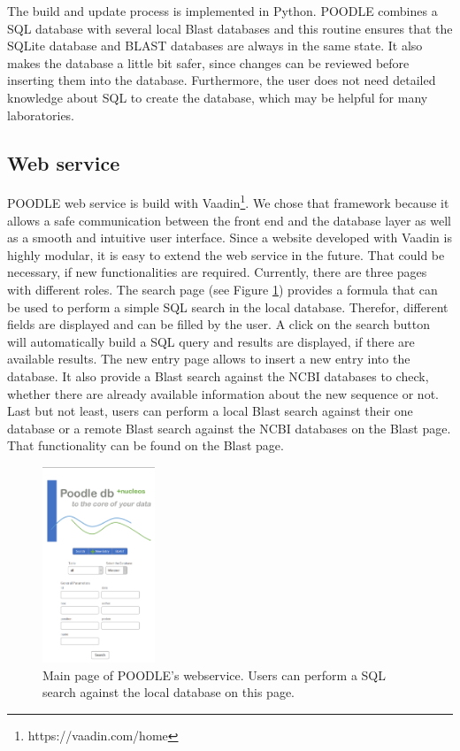 \documentclass{bioinfo}
\begin{document}
\begin{methods}
The build and update process is implemented in Python. POODLE combines a SQL database with several 
local Blast databases and this routine 
ensures that the SQLite database and BLAST databases are always in the same state. 
It also makes the database a little bit safer, since changes can be reviewed before inserting them 
into the database. Furthermore, the user does not need detailed knowledge about SQL to create the 
database, which may be helpful for many laboratories.

\subsection{Web service}

POODLE web service is build with Vaadin\footnote{https://vaadin.com/home}. We chose that framework 
because it allows a safe 
communication between the front end and the database layer as well as a smooth and intuitive user 
interface. Since a website developed with Vaadin is highly modular, it is easy to extend the web 
service in the future. That could be necessary, if new functionalities are required. Currently, 
there are three pages with different roles. The search page (see Figure \ref{fig:poodleMain}) provides a formula that can be used 
to perform a simple SQL search in the local database. Therefor, different fields are displayed and 
can be filled by the user. A click on the search button will automatically build a SQL query and 
results are displayed, if there are available results. The new entry page allows to insert a new 
entry into the database. It also provide a Blast search against the NCBI databases to check, whether 
there are already available information about the new sequence or not. Last but not least, users can 
perform a local Blast search against their one database or a remote Blast search against the NCBI 
databases on the Blast page. That functionality can be found on the Blast page. 

\begin{figure}[!tpb]
 \centering
 \includegraphics[width=0.3\textwidth]{../img/Poodle_MainPage.png}
 \caption{Main page of POODLE's webservice. Users can perform a SQL search against the local database on this page.}
 \label{fig:poodleMain}
\end{figure}



\end{methods}
\end{document}
